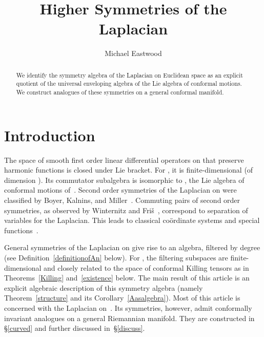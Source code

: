 \documentclass[a4paper,12pt]{amsart}
\begin{document}
\title{Higher Symmetries of the Laplacian}
\author[Michael Eastwood]{Michael Eastwood}
\address{Department of Pure Mathematics\\ University of Adelaide,\newline
         \indent South AUSTRALIA 5005}

\begin{abstract} We identify the symmetry algebra of the Laplacian on
Euclidean space as an explicit quotient of the universal enveloping algebra of
the Lie algebra of conformal motions. We construct analogues of these
symmetries on a general conformal manifold.
\end{abstract}

\maketitle

\renewcommand{\thefootnote}{}

\section{Introduction}
The space of smooth first order linear differential operators on
\coordHE{} that preserve harmonic functions is closed under Lie bracket.
For \coordHE{}, it is finite-dimensional (of dimension \coordHE{}). Its
commutator subalgebra is isomorphic to \coordHE{}, the Lie
algebra of conformal motions of~\coordHE{}. Second order symmetries
of the Laplacian on \coordHE{} were classified by Boyer, Kalnins, and
Miller~\cite{bkm}. Commuting pairs of second order symmetries, as observed by
Winternitz and Fri\v{s}~\cite{wf}, correspond to separation of variables for
the Laplacian. This leads to classical co\"ordinate systems and special
functions~\cite{bkm,miller}.

General symmetries of the Laplacian on \coordHE{} give rise to an algebra,
filtered by degree (see Definition~\ref{definitionofAn} below). For \coordHE{},
the filtering subspaces are finite-dimensional and closely related to the space
of conformal Killing tensors as in Theorems~\ref{Killing} and~\ref{existence}
below. The main result of this article is an explicit algebraic description of
this symmetry algebra (namely Theorem~\ref{structure} and its
Corollary~\ref{Aasalgebra}). Most of this article is concerned with the
Laplacian on~\coordHE{}. Its symmetries, however, admit conformally
invariant analogues on a general Riemannian manifold. They are constructed in
\S\ref{curved} and further discussed in~\S\ref{discuss}.
\end{document}
